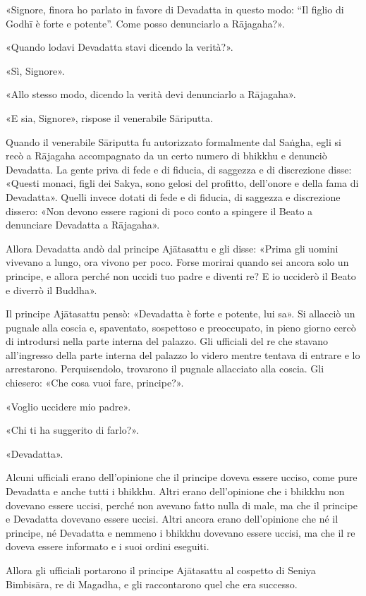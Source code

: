 «Signore, finora ho parlato in favore di Devadatta in questo modo: “Il figlio di
Godhī è forte e potente”. Come posso denunciarlo a Rājagaha?».

«Quando lodavi Devadatta stavi dicendo la verità?».

«Sì, Signore».

«Allo stesso modo, dicendo la verità devi denunciarlo a Rājagaha».

«E sia, Signore», rispose il venerabile Sāriputta.

Quando il venerabile Sāriputta fu autorizzato formalmente dal Saṅgha, egli si
recò a Rājagaha accompagnato da un certo numero di bhikkhu e denunciò Devadatta.
La gente priva di fede e di fiducia, di saggezza e di discrezione disse: «Questi
monaci, figli dei Sakya, sono gelosi del profitto, dell’onore e della fama di
Devadatta». Quelli invece dotati di fede e di fiducia, di saggezza e discrezione
dissero: «Non devono essere ragioni di poco conto a spingere il Beato a
denunciare Devadatta a Rājagaha».

Allora Devadatta andò dal principe Ajātasattu e gli disse: «Prima gli uomini
vivevano a lungo, ora vivono per poco. Forse morirai quando sei ancora solo un
principe, e allora perché non uccidi tuo padre e diventi re? E io ucciderò il
Beato e diverrò il Buddha».

Il principe Ajātasattu pensò: «Devadatta è forte e potente, lui sa». Si allacciò
un pugnale alla coscia e, spaventato, sospettoso e preoccupato, in pieno giorno
cercò di introdursi nella parte interna del palazzo. Gli ufficiali del re che
stavano all’ingresso della parte interna del palazzo lo videro mentre tentava di
entrare e lo arrestarono. Perquisendolo, trovarono il pugnale allacciato alla
coscia. Gli chiesero: «Che cosa vuoi fare, principe?».

«Voglio uccidere mio padre».

«Chi ti ha suggerito di farlo?».

«Devadatta».

Alcuni ufficiali erano dell’opinione che il principe doveva essere ucciso, come
pure Devadatta e anche tutti i bhikkhu. Altri erano dell’opinione che i bhikkhu
non dovevano essere uccisi, perché non avevano fatto nulla di male, ma che il
principe e Devadatta dovevano essere uccisi. Altri ancora erano dell’opinione
che né il principe, né Devadatta e nemmeno i bhikkhu dovevano essere uccisi, ma
che il re doveva essere informato e i suoi ordini eseguiti.

Allora gli ufficiali portarono il principe Ajātasattu al cospetto di Seniya
Bimbisāra, re di Magadha, e gli raccontarono quel che era successo.

